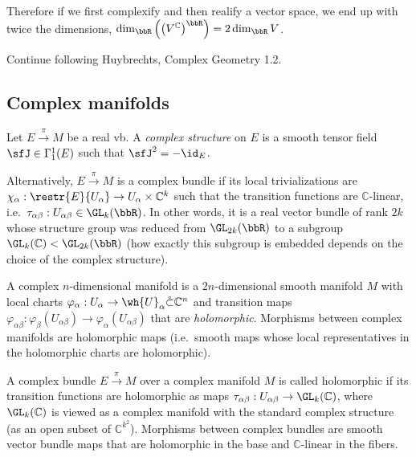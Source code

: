 Therefore if we first complexify and then realify a vector space, we end up with twice the dimensions, $\dim_\bbR \left(\left(V^\mathbb{C}\right)^\bbR \right)=2\dim_\bbR V$.


Continue following Huybrechts, Complex Geometry 1.2.







\subsection{Complex manifolds}

\begin{defn}
    Let $E\overset\pi\to M$ be a real \gls{vb}. A \emph{complex structure} on $E$ is a smooth tensor field $\sfJ\in\Gamma^1_1(E)$ such that $\sfJ^2=-\id_E$.
    
    Alternatively, $E\overset\pi\to M$ is a complex bundle if its local trivializations are $\chi_\alpha:\restr{E}{U_\alpha}\to U_\alpha\times \mathbb{C}^k$ such that the transition functions are $\mathbb{C}$-linear, i.e.\ $\tau_{\alpha\beta}:U_{\alpha\beta}\in \GL_k(\bbR )$. In other words, it is a real vector bundle of rank $2k$ whose structure group was reduced from $\GL_{2k}(\bbR )$ to a subgroup $\GL_k(\mathbb{C})<\GL_{2k}(\bbR )$ (how exactly this subgroup is embedded depends on the choice of the complex structure).
\end{defn}

\begin{defn}
    A complex $n$-dimensional manifold is a $2n$-dimensional smooth manifold $M$ with local charts $\varphi_\alpha:U_\alpha\to\wh{U}_\alpha\mathring\subset\mathbb{C}^n$ and transition maps $\varphi_{\alpha\beta}:\varphi_\beta(U_{\alpha\beta})\to\varphi_\alpha(U_{\alpha\beta})$ that are \emph{holomorphic}. Morphisms between complex manifolds are holomorphic maps (i.e.\ smooth maps whose local representatives in the holomorphic charts are holomorphic).
\end{defn}


\begin{defn}
    A complex bundle $E\overset\pi\to M$ over a complex manifold $M$ is called holomorphic if its transition functions are holomorphic as maps $\tau_{\alpha\beta}:U_{\alpha\beta}\to \GL_k(\mathbb{C})$, where $\GL_k(\mathbb{C})$ is viewed as a complex manifold with the standard complex structure (as an open subset of $\mathbb{C}^{k^2}$). Morphisms between complex bundles are smooth vector bundle maps that are holomorphic in the base and $\mathbb{C}$-linear in the fibers.
\end{defn}

